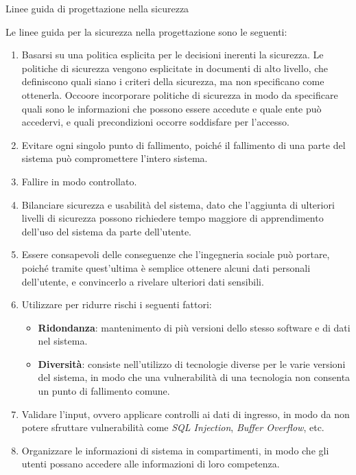 \begin{problem}{2.7}
Linee guida di progettazione nella sicurezza
\end{problem}
\begin{solution}
Le linee guida per la sicurezza nella progettazione sono le seguenti:
\begin{enumerate}
	\item Basarsi su una politica esplicita per le decisioni inerenti la sicurezza.
	\newline
	Le politiche di sicurezza vengono esplicitate in documenti di alto livello, che definiscono quali siano i criteri della sicurezza, ma non specificano come ottenerla.
	Occoore incorporare politiche di sicurezza in modo da specificare quali sono le informazioni che possono essere accedute e quale ente può accedervi, e quali precondizioni occorre soddisfare per l'accesso.
	\item Evitare ogni singolo punto di fallimento, poiché il fallimento di una parte del sistema può compromettere l'intero sistema.
	\item Fallire in modo controllato.
	\item Bilanciare sicurezza e usabilità del sistema, dato che l'aggiunta di ulteriori livelli di sicurezza possono richiedere tempo maggiore di apprendimento dell'uso del sistema da parte dell'utente.
	\item Essere consapevoli delle conseguenze che l'ingegneria sociale può portare, poiché tramite quest'ultima è semplice ottenere alcuni dati personali dell'utente, e convincerlo a rivelare ulteriori dati sensibili.
	\item Utilizzare per ridurre rischi i seguenti fattori:
	\begin{itemize}
		\item \textbf{Ridondanza}: mantenimento di più versioni dello stesso software e di dati nel sistema.
		\item \textbf{Diversità}: consiste nell'utilizzo di tecnologie diverse per le varie versioni del sistema, in modo che una vulnerabilità di una tecnologia non consenta un punto di fallimento comune.
	\end{itemize}
	\item Validare l'input, ovvero applicare controlli ai dati di ingresso, in modo da non potere sfruttare vulnerabilità come \textit{SQL Injection}, \textit{Buffer Overflow}, etc.
	\item Organizzare le informazioni di sistema in compartimenti, in modo che gli utenti possano accedere alle informazioni di loro competenza.

\end{enumerate}
\end{solution}
